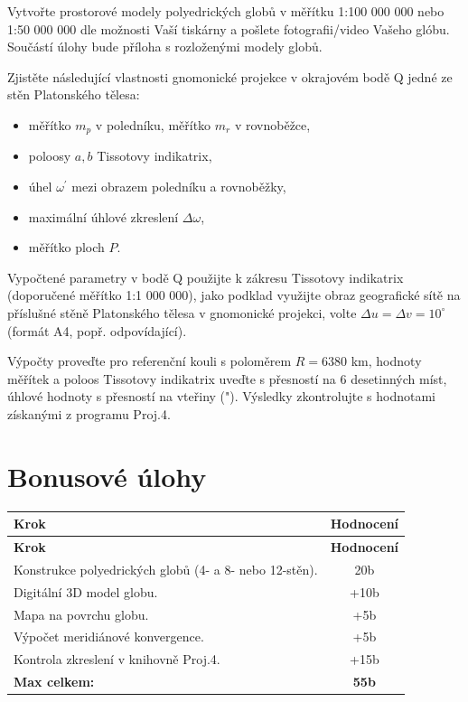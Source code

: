 \documentclass[12pt, a4paper]{article}
\begin{document}
Vytvořte prostorové modely polyedrických globů v měřítku 1:100 000 000 nebo 1:50 000 000 dle možnosti Vaší tiskárny a pošlete fotografii/video Vašeho glóbu. Součástí úlohy bude příloha s rozloženými modely globů.

Zjistěte následující vlastnosti gnomonické projekce v okrajovém bodě Q jedné ze stěn Platonského tělesa:
\begin{itemize}
    \item měřítko $m_{p}$ v poledníku, měřítko $m_{r}$ v rovnoběžce,
    \item poloosy $a, b$ Tissotovy indikatrix,
    \item úhel $\omega^{\prime}$ mezi obrazem poledníku a rovnoběžky,
    \item maximální úhlové zkreslení $\Delta\omega$,
    \item měřítko ploch $P$.
\end{itemize}

Vypočtené parametry v bodě Q použijte k zákresu Tissotovy indikatrix (doporučené měřítko 1:1 000 000), jako podklad využijte obraz geografické sítě na příslušné stěně Platonského tělesa v gnomonické projekci, volte $\Delta u = \Delta v = 10^{\circ}$ (formát A4, popř. odpovídající).

Výpočty proveďte pro referenční kouli s poloměrem $R = 6380$ km, hodnoty měřítek a poloos Tissotovy indikatrix uveďte s přesností na 6 desetinných míst, úhlové hodnoty s přesností na vteřiny ("). Výsledky zkontrolujte s hodnotami získanými z programu Proj.4.
\vspace{1em}
\vspace{1em}
\vspace{1em}
\vspace{1em}
\vspace{1em}

\section{Bonusové úlohy}
\begin{small}
\begin{longtable}{|p{12cm}|c|}
    \hline
    \textbf{Krok} & \textbf{Hodnocení} \\
    \hline
    \endfirsthead
    
    \hline
    \textbf{Krok} & \textbf{Hodnocení} \\
    \hline
    \endhead

    Konstrukce polyedrických globů (4- a 8- nebo 12-stěn). & 20b \\
    \hline
    Digitální 3D model globu. & +10b \\
    \hline
    Mapa na povrchu globu. & +5b \\
    \hline
    Výpočet meridiánové konvergence. & +5b \\
    \hline
    Kontrola zkreslení v knihovně Proj.4. & +15b \\
    \hline
    \textbf{Max celkem:} & \textbf{55b} \\
    \hline
\end{longtable}
\end{small}
\newpage
\clearpage
\end{document}
